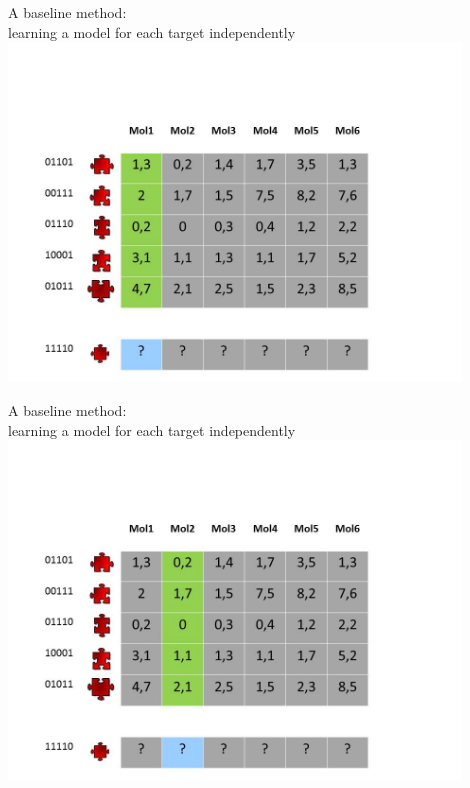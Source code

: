 \documentclass[]{beamer}
\begin{document}
\begin{frame}{A baseline method:\\
learning a model for each target independently}
\includegraphics[width=0.9\textwidth,trim = 0 0 100 100,clip]{Figures/pictures/Slide13}
\end{frame}

\begin{frame}{A baseline method:\\
learning a model for each target independently}
\includegraphics[width=0.9\textwidth,trim = 0 0 100 100,clip]{Figures/pictures/Slide14}
\end{frame}
\end{document}
